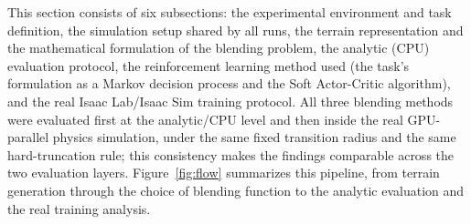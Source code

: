 This section consists of six subsections: the experimental environment and task definition, the simulation setup shared by all runs, the terrain representation and the mathematical formulation of the blending problem, the analytic (CPU) evaluation protocol, the reinforcement learning method used (the task's formulation as a Markov decision process and the Soft Actor-Critic algorithm), and the real Isaac Lab/Isaac Sim training protocol. All three blending methods were evaluated first at the analytic/CPU level and then inside the real GPU-parallel physics simulation, under the same fixed transition radius and the same hard-truncation rule; this consistency makes the findings comparable across the two evaluation layers. Figure~\ref{fig:flow} summarizes this pipeline, from terrain generation through the choice of blending function to the analytic evaluation and the real training analysis.
